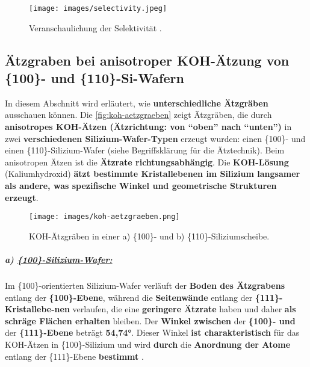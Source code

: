 \documentclass{article} %
\begin{document}
\begin{figure}[htb!]
    \centering
    \texttt{[image: images/selectivity.jpeg]} %
    \captionsetup{labelfont=bf, width=.9\textwidth} %
    \caption{Veranschaulichung der Selektivität \cite{schmid2024Aetzen}.}
    \label{fig:selectivity}
\end{figure}





\vspace{1em}

\subsection{Ätzgraben bei anisotroper KOH-Ätzung von \{100\}- und \{110\}-Si-Wafern}

In diesem Abschnitt wird erläutert, wie \textbf{unterschiedliche Ätzgräben} ausschauen können. Die \autoref{fig:koh-aetzgraeben} zeigt Ätzgräben, die durch \textbf{anisotropes KOH-Ätzen (Ätzrichtung: von ``oben'' nach ``unten'')} in zwei \textbf{verschiedenen Silizium-Wafer-Typen} erzeugt wurden: einen \{100\}- und einen \{110\}-Silizium-Wafer (siehe Begriffsklärung für die Ätztechnik). Beim anisotropen Ätzen ist die \textbf{Ätzrate richtungsabhängig}. Die \textbf{KOH-Lösung} (Kaliumhydroxid) \textbf{ätzt bestimmte Kristallebenen im Silizium langsamer als andere, was spezifische Winkel und geometrische Strukturen erzeugt}.

\begin{figure}[htb!]
    \centering
    \texttt{[image: images/koh-aetzgraeben.png]} %
    \captionsetup{labelfont=bf, width=\textwidth} %
    \caption{KOH-Ätzgräben in einer a) \{100\}- und b) \{110\}-Siliziumscheibe.}
    \label{fig:koh-aetzgraeben}
\end{figure}

\subparagraph{a) \uline{\{100\}-Silizium-Wafer:}} Im \{100\}-orientierten Silizium-Wafer verläuft der \textbf{Boden des Ätzgrabens} entlang der \textbf{\{100\}-Ebene}, während die \textbf{Seitenwände} entlang der \textbf{\{111\}-Kristallebe-nen} verlaufen, die eine \textbf{geringere Ätzrate} haben und daher \textbf{als schräge Flächen erhalten} bleiben. Der \textbf{Winkel zwischen} der \textbf{\{100\}- und} der \textbf{\{111\}-Ebene} beträgt \textbf{54,74°}. Dieser Winkel \textbf{ist charakteristisch} für das KOH-Ätzen in \{100\}-Silizium und wird \textbf{durch} die \textbf{Anordnung der Atome} entlang der \{111\}-Ebene \textbf{bestimmt} \cite{madou2002}.
\end{document}
